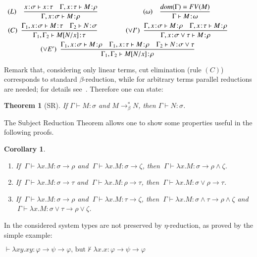 \documentclass[UKenglish]{eptcs}
\newtheorem{corollary}[fact]{Corollary}
\newtheorem{theorem}[fact]{Theorem}
\newcommand{\dup}{\! : \!}
\newcommand{\tA}{\sigma}       \newcommand{\tB}{\tau}
\newcommand{\tC}{\rho}
\newcommand{\tD}{\zeta}
\newcommand{\tu}{\omega}
\newcommand{\B}{\Gamma}
\newcommand{\db}{\displaystyle}
\newcommand{\labelx}[1]{\label{#1}}
\newcommand{\myformula}[1]{\\[0.5pt]\centerline{#1}}
\begin{document}
\centerline{$\begin{array}{ccc}
( L) \quad \db \frac{x\dup\tA \vdash x\dup\tB\quad \B,x\dup\tB \vdash M\dup\tC}{\B,x\dup\tA \vdash M\dup\tC}
&\qquad &(\tu) \quad \db \frac{dom(\Gamma)=FV (M)}{\B \vdash  M\dup\tu}\\[10pt]
(C) ~~ \db \frac{\B_{1},x\dup\tA \vdash M\dup\tB\quad \B_{2} \vdash N\dup\tA}{\B_{1}, \B_{2} \vdash M[N/x]\dup\tB}
&\qquad&(\vee I') ~~ \db \frac{\B, x\dup\tA \vdash M\dup\tC\quad \B, x\dup\tB \vdash M\dup\tC}{\B, x\dup\tA\vee\tB \vdash M\dup\tC}
\\[10pt]
\multicolumn{3}{c}{
(\vee E') ~~ \db \frac{\B_{1}, x\dup\tA \vdash M\dup\tC\quad \B_{1}, x\dup\tB \vdash M\dup\tC\quad \B_{2} \vdash N\dup\tA\vee\tB}{\B_{1},\B_{2} \vdash M[N/x]\dup\tC}}
\end{array}$}
\smallskip
\smallskip
Remark that, considering only linear terms, cut elimination (rule $(C)$) corresponds to standard $\beta$-reduction, while for arbitrary terms  parallel reductions are needed; for details see~\cite{barba}.
Therefore one can state:
\smallskip
\begin{theorem}[SR] \labelx{srtheorem}
If  $\B \vdash M\dup\tA$ and $M\longrightarrow_{\beta}^*N$, then $\B \vdash
N\dup\tA$.
\end{theorem}

\smallskip
The Subject Reduction Theorem allows one to show some properties useful in the following proofs.

\begin{corollary} \labelx{cor}
\begin{enumerate}
\item\labelx{cor1} If $~\B\vdash \lambda x.M\dup\tA\to\tC$ and $~\B\vdash \lambda x.M\dup\tA\to\tD$, then $~\B\vdash \lambda x.M\dup\tA\to \tC\wedge\tD$.
\item\labelx{cor2} If $~\B\vdash \lambda x.M\dup\tA\to\tB$ and $~\B\vdash \lambda x.M\dup\tC\to\tB$, then $~\B\vdash \lambda x.M\dup\tA\vee\tC\to\tB$.
\item\labelx{cor5} If $~\B\vdash \lambda x.M\dup\tA\to\tC$ and $~\B\vdash \lambda x.M\dup\tB\to\tD$, then $~\B\vdash \lambda x.M\dup\tA\wedge\tB\to \tC\wedge\tD$ and $~\B\vdash \lambda x.M\dup\tA\vee\tB\to\tC\vee\tD$.
\end{enumerate}
\end{corollary}


\smallskip

In the considered system types are not preserved by $\eta$-reduction, as proved by the simple example:
\myformula{$\vdash \lambda xy.xy\dup \varphi\to\psi\to\varphi\text{, but} \not\vdash\lambda x.x \dup \varphi\to\psi\to\varphi$}
\end{document}
